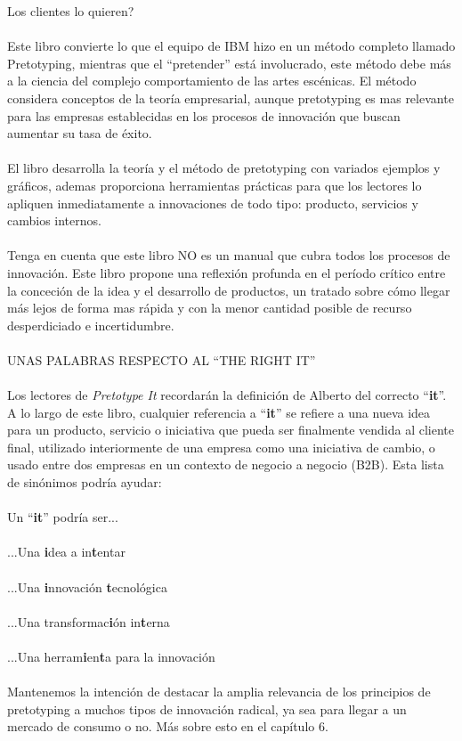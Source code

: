\documentclass{article}
\begin{document}
Los clientes lo quieren?
\\ \\
Este libro convierte lo que el equipo de IBM hizo en un m\'etodo completo llamado Pretotyping, mientras que el ``pretender'' est\'a involucrado, este m\'etodo debe m\'as a la ciencia del complejo comportamiento de las artes esc\'enicas. El m\'etodo considera conceptos de la teor\'ia empresarial, aunque pretotyping es mas relevante para las empresas establecidas en los procesos de innovaci\'on que buscan aumentar su tasa de \'exito.
\\ \\
El libro desarrolla la teor\'ia y el m\'etodo de pretotyping con variados ejemplos y gr\'aficos, ademas proporciona herramientas pr\'acticas para que los lectores lo apliquen inmediatamente a innovaciones de todo tipo: producto, servicios y cambios internos.
\\ \\
Tenga en cuenta que este libro NO es un manual que cubra todos los procesos de innovaci\'on. Este libro propone una reflexi\'on profunda en el per\'iodo cr\'itico entre la conceci\'on de la idea y el desarrollo de productos, un tratado sobre c\'omo llegar m\'as lejos de forma mas r\'apida y con la menor cantidad posible de recurso desperdiciado e incertidumbre.
\\ \\
UNAS PALABRAS RESPECTO AL ``THE RIGHT IT''
\\ \\
Los lectores de \textit{Pretotype It} recordar\'an la definici\'on de Alberto del correcto ``\textbf{it}''. A lo largo de este libro, cualquier referencia a ``\textbf{it}'' se refiere a una nueva idea para un producto, servicio o iniciativa que pueda ser finalmente vendida al cliente final, utilizado interiormente de una empresa como una iniciativa de cambio, o usado entre dos empresas en un contexto de negocio a negocio (B2B). 
Esta lista de sin\'onimos podr\'ia ayudar:
\\ \\
Un ``\textbf{it}'' podr\'ia ser...
\\ \\
...Una \textbf{i}dea a in\textbf{t}entar
\\ \\
...Una \textbf{i}nnovaci\'on \textbf{t}ecnol\'ogica
\\ \\
...Una transformac\textbf{i}\'on in\textbf{t}erna
\\ \\
...Una herram\textbf{i}en\textbf{t}a para la innovaci\'on
\\ \\
Mantenemos la intenci\'on de destacar la amplia relevancia de los principios de pretotyping a muchos tipos de innovaci\'on radical, ya sea para llegar a un mercado de consumo o no. M\'as sobre esto en el cap\'itulo 6.
\end{document}
